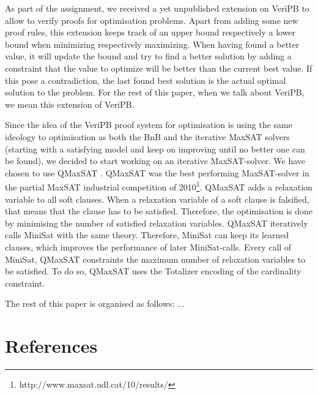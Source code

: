 \documentclass{article}
\theoremstyle{mytheoremstyle}
\theoremstyle{mytheoremstyle}
\theoremstyle{myproblemstyle}
\begin{document}


As part of the assignment, we received a yet unpublished extension on VeriPB to allow to verify proofs for optimisation problems. Apart from adding some new proof rules, this extension keeps track of
an upper bound respectively a lower bound when minimizing respectively maximizing. When having found a better value, it will update the bound and try to find a better solution by adding a constraint
that the value to optimize will be better than the current best value. If this pose a contradiction, the last found best solution is the actual optimal solution to the problem. For the rest of this
paper, when we talk about VeriPB, we mean this extension of VeriPB.\newline \par

Since the idea of the VeriPB proof system for optimisation is using the same ideology to optimisation as both the BnB and the iterative MaxSAT solvers (starting with a satisfying model and keep on
improving until no better one can be found), we decided to start working on an iterative MaxSAT-solver. We have chosen to use QMaxSAT \autocite{qmaxsat}. QMaxSAT was the best performing MaxSAT-solver
in the partial MaxSAT industrial competition of 2010\footnote{http://www.maxsat.udl.cat/10/results/}. QMaxSAT adds a relaxation variable to all soft clauses. When a relaxation variable of a soft
clause is falsified, that means that the clause has to be satisfied. Therefore, the optimisation is done by minimising the number of satisfied relaxation variables. QMaxSAT iteratively calls MiniSat
\autocite{minisat} with the same theory. Therefore, MiniSat can keep its learned clauses, which improves the performance of later MiniSat-calls. Every call of MiniSat, QMaxSAT constraints the maximum
number of relaxation variables to be satisfied. To do so, QMaxSAT uses the Totalizer encoding \autocite{encoding} of the cardinality constraint. \newline \par

The rest of this paper is organised as follows: ...

\section{References}
\printbibliography[heading=none]
\end{document}
